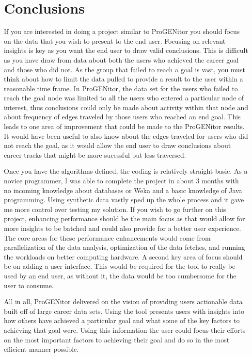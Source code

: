 \section{Conclusions}
\label{sect:conclusions}
If you are interested in doing a project similar to ProGENitor you should focus
on the data that you wish to present to the end user.  Focusing on relevant
insights is key as you want the end user to draw valid conclusions.  This is
difficult as you have draw from data about both the users who achieved the
career goal and those who did not.  As the group that failed to reach a goal is
vast, you must think about how to limit the data pulled to provide a result to
the user within a reasonable time frame.  In ProGENitor, the data set for the
users who failed to reach the goal node was limited to all the users who entered
a particular node of interest, thus conclusions could only be made about
activity within that node and about frequency of edges traveled by those users
who reached an end goal.  This leads to one area of improvement that could be
made to the ProGENitor results.  It would have been useful to also know about
the edges traveled for users who did not reach the goal, as it would allow the
end user to draw conclusions about career tracks that might be more sucessful
but less traversed.

Once you have the algorithms defined, the coding is relatively straight
basic.  As a novice programmer, I was able to complete the project in about 3
months with no incoming knowledge about databases or Weka and a basic knowledge
of Java programming.  Using synthetic data vastly sped up the whole process and
it gave me more control over testing my solution.  If you wish to go further on
this project, enhancing performance should be the main focus as that would allow
for more insights to be batched and could also provide for a better user
experience.  The core areas for these performance enhancements would come from
parallelization of the data analysis, optimization of the data fetches, and
running the workloads on better computing hardware.  A second key area of focus
should be on adding a user interface.  This would be required for the tool to
really be used by an end user, as without it, the data would be too cumbersome
for the user to consume.

All in all, ProGENitor delivered on the vision of providing users actionable
data built off of large career data sets.  Using the tool presents users with
insights into how others have achieved a particular goal and what some of the
key factors to achieving that goal were.  Using this information the user could
focus their efforts on the most important factors to achieving their goal and do
so in the most efficient manner possible.
